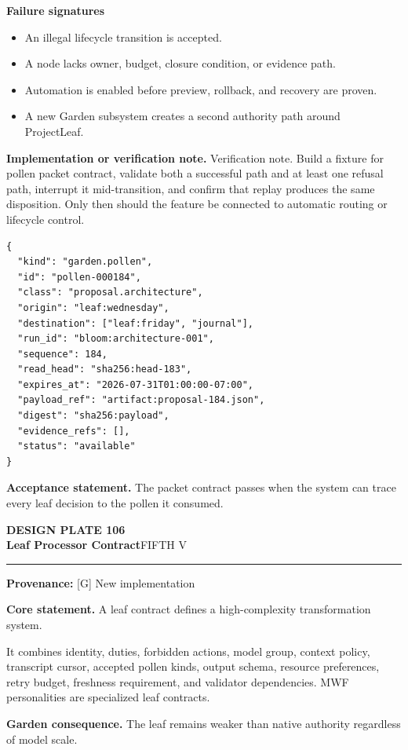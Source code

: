 \documentclass[10pt,letterpaper,oneside]{article}
\newcommand{\prov}[1]{\textcolor{gardenBlue}{\sffamily\footnotesize\textbf{Provenance:} #1}}
\newcommand{\platetitle}[3]{%
  \begin{minipage}[t][0.54in][t]{\textwidth}
  {\sffamily\bfseries\color{gardenDeep}\fontsize{9}{10}\selectfont DESIGN PLATE #1}\\[-1pt]
  {\sffamily\bfseries\color{gardenInk}\fontsize{16.5}{18}\selectfont #2}\hfill{\sffamily\color{gardenGreen}\large #3}
  \end{minipage}\vspace{-2pt}\hrule\vspace{5pt}}
\begin{document}
\textbf{Failure signatures}
\begin{itemize}
\item An illegal lifecycle transition is accepted.
\item A node lacks owner, budget, closure condition, or evidence path.
\item Automation is enabled before preview, rollback, and recovery are proven.
\item A new Garden subsystem creates a second authority path around ProjectLeaf.
\end{itemize}
\textbf{Implementation or verification note.} Verification note. Build a fixture for pollen packet contract, validate both a successful path and at least one refusal path, interrupt it mid-transition, and confirm that replay produces the same disposition. Only then should the feature be connected to automatic routing or lifecycle control.

\begin{lstlisting}
{
  "kind": "garden.pollen",
  "id": "pollen-000184",
  "class": "proposal.architecture",
  "origin": "leaf:wednesday",
  "destination": ["leaf:friday", "journal"],
  "run_id": "bloom:architecture-001",
  "sequence": 184,
  "read_head": "sha256:head-183",
  "expires_at": "2026-07-31T01:00:00-07:00",
  "payload_ref": "artifact:proposal-184.json",
  "digest": "sha256:payload",
  "evidence_refs": [],
  "status": "available"
}
\end{lstlisting}
\begin{acceptbox}
\textbf{Acceptance statement.} The packet contract passes when the system can trace every leaf decision to the pollen it consumed.
\end{acceptbox}
\newpage
\platetitle{106}{Leaf Processor Contract}{FIFTH V}
\prov{[G] New implementation}
\fontsize{8.85}{10.45}\selectfont
\begin{corebox}
\textbf{Core statement.} A leaf contract defines a high-complexity transformation system.
\end{corebox}
It combines identity, duties, forbidden actions, model group, context policy, transcript cursor, accepted pollen kinds, output schema, resource preferences, retry budget, freshness requirement, and validator dependencies. MWF personalities are specialized leaf contracts.

\textbf{Garden consequence.} The leaf remains weaker than native authority regardless of model scale.
\end{document}
